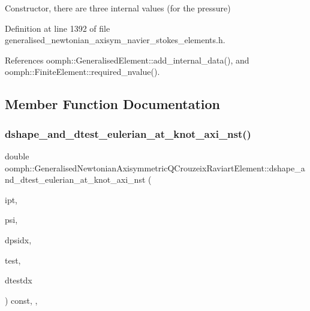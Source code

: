 Constructor, there are three internal values (for the pressure) 



Definition at line 1392 of file generalised\+\_\+newtonian\+\_\+axisym\+\_\+navier\+\_\+stokes\+\_\+elements.\+h.



References oomph\+::\+Generalised\+Element\+::add\+\_\+internal\+\_\+data(), and oomph\+::\+Finite\+Element\+::required\+\_\+nvalue().



\subsection{Member Function Documentation}
\mbox{\label{classoomph_1_1GeneralisedNewtonianAxisymmetricQCrouzeixRaviartElement_a323947d1bd37a0e58462726d69ba2efb}} 
\subsubsection{\texorpdfstring{dshape\+\_\+and\+\_\+dtest\+\_\+eulerian\+\_\+at\+\_\+knot\+\_\+axi\+\_\+nst()}{dshape\_and\_dtest\_eulerian\_at\_knot\_axi\_nst()}\hspace{0.1cm}{\footnotesize\ttfamily [1/2]}}
{\footnotesize\ttfamily double oomph\+::\+Generalised\+Newtonian\+Axisymmetric\+Q\+Crouzeix\+Raviart\+Element\+::dshape\+\_\+and\+\_\+dtest\+\_\+eulerian\+\_\+at\+\_\+knot\+\_\+axi\+\_\+nst (\begin{DoxyParamCaption}\item[{const unsigned \&}]{ipt,  }\item[{\hyperlink{classoomph_1_1Shape}{Shape} \&}]{psi,  }\item[{\hyperlink{classoomph_1_1DShape}{D\+Shape} \&}]{dpsidx,  }\item[{\hyperlink{classoomph_1_1Shape}{Shape} \&}]{test,  }\item[{\hyperlink{classoomph_1_1DShape}{D\+Shape} \&}]{dtestdx }\end{DoxyParamCaption}) const\hspace{0.3cm}{\ttfamily [inline]}, {\ttfamily [protected]}, {\ttfamily [virtual]}}



